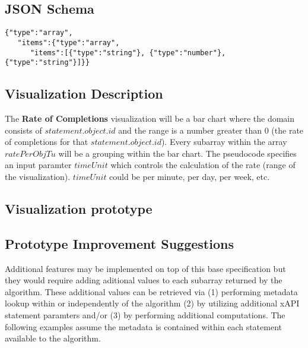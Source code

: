 \documentclass{article}
\begin{document}
\subsection{JSON Schema}

\begin{lstlisting}[]
{"type":"array",
   "items":{"type":"array",
      "items":[{"type":"string"}, {"type":"number"},
{"type":"string"}]}}
\end{lstlisting}

\subsection{Visualization Description}

The \textbf{Rate of Completions} visualization will be
a bar chart where the domain consists of $statement.object.id$ and the
range is a number greater than 0 (the rate of completions for that
$statement.object.id$). Every subarray within the array $ratePerObjTu$
will be a grouping within the bar chart. The pseudocode specifies an
input paramter $timeUnit$ which controls the calculation of the rate
(range of the visualization). $timeUnit$ could be per minute, per day,
per week, etc.

\subsection{Visualization prototype}



\subsection{Prototype Improvement Suggestions}
Additional features may be implemented on top of this base
specification but they would require adding aditional values to each
subarray returned by the algorithm. These additional values can be
retrieved via (1) performing metadata lookup within or independently of the
algorithm (2) by utilizing additional xAPI statement paramters and/or (3) by
performing additional computations. The following examples assume the
metadata is contained within each statement available to the algorithm.
\end{document}
